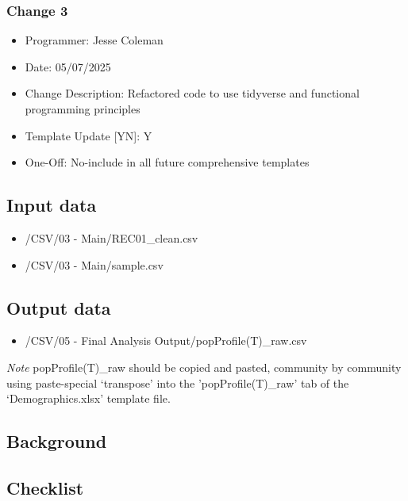 \documentclass[
]{article}
\providecommand{\tightlist}{%
  \setlength{\itemsep}{0pt}\setlength{\parskip}{0pt}}
\begin{document}
\subsubsection{Change 3}\label{change-3}

\begin{itemize}
\tightlist
\item
  Programmer: Jesse Coleman
\item
  Date: 05/07/2025
\item
  Change Description: Refactored code to use tidyverse and functional
  programming principles
\item
  Template Update {[}Y\textbar N{]}: Y
\item
  One-Off: No-include in all future comprehensive templates
\end{itemize}

\subsection{Input data}\label{input-data}

\begin{itemize}
\tightlist
\item
  /CSV/03 - Main/REC01\_clean.csv\\
\item
  /CSV/03 - Main/sample.csv
\end{itemize}

\subsection{Output data}\label{output-data}

\begin{itemize}
\tightlist
\item
  /CSV/05 - Final Analysis Output/popProfile(T)\_raw.csv
\end{itemize}

\emph{Note} popProfile(T)\_raw should be copied and pasted, community by
community using paste-special `transpose' into the 'popProfile(T)\_raw'
tab of the `Demographics.xlsx' template file.

\subsection{Background}\label{background}

\subsection{Checklist}\label{checklist}
\end{document}
